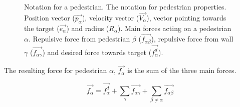 \begin{figure}[ht]
    \centering
    \caption[Notation for pedestrians]{Notation for a pedestrian.  
     The notation for pedestrian properties. Position 
    vector ($ \overrightarrow{p_{\alpha}} $), velocity vector ($ 
    \overrightarrow{V_{\alpha}} $), vector pointing towards 
    the target ($\overrightarrow{e_{\alpha}}$)  and radius ($ R_{\alpha} $).
     Main forces acting on a pedestrian $\alpha$. 
    Repulsive force from pedestrian $\beta$ 
    ($\overrightarrow{f_{\alpha\beta}}$), repulsive force from wall $\gamma$ 
    ($\overrightarrow{f_{\alpha \gamma}}$) and desired force towards target 
    ($\overrightarrow{f^{d}_{\alpha}}$).}

    \label{pedestrian-notation}
\end{figure}

The resulting force for pedestrian $\alpha$, $\overrightarrow{f_{\alpha}}$ is 
the sum of the three main forces.

\begin{equation}\label{model}
    \overrightarrow{f_{\alpha}} = \overrightarrow{f^{d}_{\alpha}} +
    \sum_{\gamma} \overrightarrow{f_{\alpha \gamma}} +
    \sum_{\beta \neq \alpha} \overrightarrow{f_{\alpha \beta}}
\end{equation}

